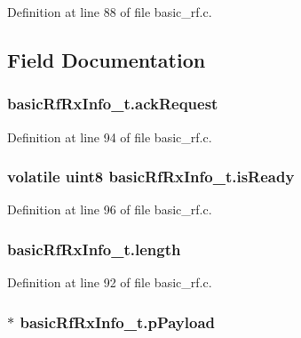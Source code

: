 Definition at line 88 of file basic\_\-rf.c.



\subsection{Field Documentation}
\hypertarget{structbasic_rf_rx_info__t_a96f75c864979021cdf81ce2085821799}{
\subsubsection[{ackRequest}]{ {\bf basicRfRxInfo\_\-t.ackRequest}}}
\label{structbasic_rf_rx_info__t_a96f75c864979021cdf81ce2085821799}


Definition at line 94 of file basic\_\-rf.c.

\hypertarget{structbasic_rf_rx_info__t_a2f4d0721248f73e49bc9e32362b6dcb1}{
\subsubsection[{isReady}]{\setlength{\rightskip}{0pt plus 5cm}volatile {\bf uint8} {\bf basicRfRxInfo\_\-t.isReady}}}
\label{structbasic_rf_rx_info__t_a2f4d0721248f73e49bc9e32362b6dcb1}


Definition at line 96 of file basic\_\-rf.c.

\hypertarget{structbasic_rf_rx_info__t_af9266e50356dd007e0b3989e17df1a82}{
\subsubsection[{length}]{ {\bf basicRfRxInfo\_\-t.length}}}
\label{structbasic_rf_rx_info__t_af9266e50356dd007e0b3989e17df1a82}


Definition at line 92 of file basic\_\-rf.c.

\hypertarget{structbasic_rf_rx_info__t_a9461585da66b9bb6d3f2e950b2c6f4dd}{
\subsubsection[{pPayload}]{$\ast$ {\bf basicRfRxInfo\_\-t.pPayload}}}
\label{structbasic_rf_rx_info__t_a9461585da66b9bb6d3f2e950b2c6f4dd}


